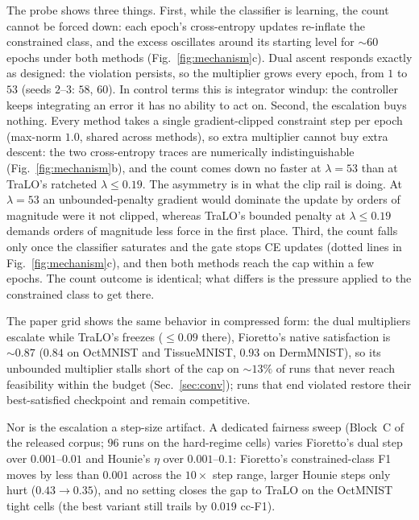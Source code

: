 \documentclass[10pt]{article}
\begin{document}
The probe shows three things. First, while the classifier is learning,
the count cannot be forced down: each epoch's cross-entropy updates
re-inflate the constrained class, and the excess oscillates around its
starting level for ${\sim}60$ epochs under both methods
(Fig.~\ref{fig:mechanism}c). Dual ascent responds exactly as designed:
the violation persists, so the multiplier grows every epoch, from $1$ to
$53$ (seeds $2$--$3$: $58$, $60$). In control terms this is integrator
windup: the controller keeps integrating an error it has no ability to
act on. Second, the escalation buys nothing. Every method takes a
single gradient-clipped constraint step per epoch (max-norm $1.0$,
shared across methods), so extra multiplier cannot buy extra descent:
the two cross-entropy traces are numerically indistinguishable
(Fig.~\ref{fig:mechanism}b), and the count comes down no faster at
$\lambda{=}53$ than at TraLO's ratcheted $\lambda\le 0.19$. The
asymmetry is in what the clip rail is doing. At $\lambda{=}53$ an
unbounded-penalty gradient would dominate the update by orders of
magnitude were it not clipped, whereas TraLO's bounded penalty at
$\lambda\le 0.19$ demands orders of magnitude less force in the first
place. Third, the count falls only once the classifier saturates and the
gate stops CE updates (dotted lines in Fig.~\ref{fig:mechanism}c), and
then both methods reach the cap within a few epochs. The count outcome is
identical; what differs is the pressure applied to the constrained class
to get there.

The paper grid shows the same behavior in compressed form: the dual
multipliers escalate while TraLO's freezes ($\le 0.09$ there),
Fioretto's native satisfaction is ${\sim}0.87$ ($0.84$ on OctMNIST and
TissueMNIST, $0.93$ on DermMNIST), so its unbounded multiplier stalls
short of the cap on ${\sim}13\%$ of runs that never reach feasibility
within the budget (Sec.~\ref{sec:conv}); runs that end violated restore
their best-satisfied checkpoint and remain competitive.

Nor is the escalation a step-size artifact. A dedicated fairness sweep
(Block~C of the released corpus; $96$ runs on the hard-regime cells)
varies Fioretto's dual step over $0.001$--$0.01$ and Hounie's $\eta$
over $0.001$--$0.1$: Fioretto's constrained-class F1 moves by less than
$0.001$ across the $10\times$ step range, larger Hounie steps only hurt
($0.43\!\to\!0.35$), and no setting closes the gap to TraLO on the
OctMNIST tight cells (the best variant still trails by $0.019$ cc-F1).
\end{document}
